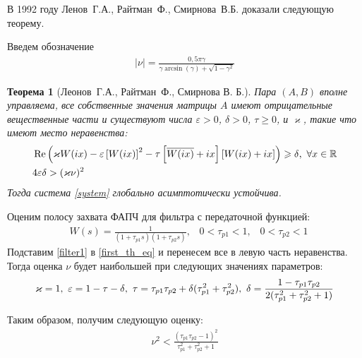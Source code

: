 \documentclass[a4paper,article,14pt]{extarticle}
\newtheorem{theorem}{Теорема}
\begin{document}
В 1992 году Ленов~Г.\:А., Райтман~Ф., Смирнова~В.\:Б. доказали следующую теорему.
    
Введем обозначение
 \begin{equation}
 \begin{aligned}
\mid\nu\mid = \frac{0,5\pi\gamma}{\gamma \operatorname{arcsin} (\gamma) + \sqrt{1-\gamma^2}}
 \end{aligned}
\end{equation}
\begin{theorem}[Леонов~Г.\:А., Райтман~Ф., Смирнова В. Б.]
Пара $(A, B)$ вполне управляема, все собственные значения матрицы $A$ имеют отрицательные вещественные части и существуют числа $\varepsilon > 0$, $\delta > 0$, $\tau \geqslant 0$, и $\varkappa$, такие что имеют место неравенства:
 \begin{align}
&\operatorname{Re}\left( \varkappa W(ix)- \varepsilon\left[W(ix)\right]^2-\tau\left[ \overline{W(ix)}+ix \right]\left[W(ix)+ix \right]\right) \geqslant \delta \text{,}\enskip\forall x \in \mathbb{R} \label{first_th_eq}\\
&4\varepsilon\delta > (\varkappa\nu)^2
\end{align}
Тогда система \eqref{system} глобально асимптотически устойчива.
\end{theorem}

Оценим полосу захвата ФАПЧ для фильтра с передаточной функцией:
 \begin{equation}\label{filter1}
 \begin{aligned}
&W(s) = \frac{1}{(1+\tau_{p1}s)(1+\tau_{p2}s)} \text{,} \quad0 < \tau_{p1} < 1 \text{,} \quad 0 < \tau_{p2} <1
 \end{aligned}
\end{equation}
Подставим \eqref{filter1} в \eqref{first_th_eq} и перенесем все в левую часть неравенства. Тогда оценка $\nu$ будет наибольшей при следующих значениях параметров:
 \begin{equation*}
 \begin{aligned}
\varkappa = 1 \text{,} \enskip  \varepsilon = 1 - \tau - \delta \text{,} \enskip \tau = \tau_{p1}\tau_{p2} + \delta(\tau_{p1}^2+\tau_{p2}^2) \text{,} \enskip \delta = \frac{1-\tau_{p1}\tau_{p2}}{2(\tau_{p1}^2+\tau_{p2}^2 + 1)}
 \end{aligned}
\end{equation*}

Таким образом, получим следующую оценку:
\begin{equation}\label{filter1_max}
 \begin{aligned}
\nu^2 < \frac{(\tau_{p1}\tau_{p2} - 1)^2}{\tau_{p1}^2 + \tau_{p2}^2 + 1}
 \end{aligned}
\end{equation} 
\end{document}
